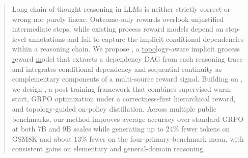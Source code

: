 \begin{abstract}
Long chain-of-thought reasoning in LLMs is neither strictly correct-or-wrong nor purely linear. Outcome-only rewards overlook unjustified intermediate steps, while existing process reward models depend on step-level annotations and fail to capture the implicit conditional dependencies within a reasoning chain.
We propose \method, a \underline{topo}logy-aware implicit \underline{p}rocess \underline{r}eward \underline{m}odel that extracts a dependency DAG from each reasoning trace and integrates conditional dependency and sequential continuity as complementary components of a multi-source reward signal. Building on \method, we design \framework, a post-training framework that combines supervised warm-start, GRPO optimization under a correctness-first hierarchical reward, and topology-guided on-policy distillation.
Across multiple public benchmarks, our method improves average accuracy over standard GRPO at both 7B and 9B scales while generating up to 24\% fewer tokens on GSM8K and about 13\% fewer on the four-primary-benchmark mean, with consistent gains on elementary and general-domain reasoning.
\end{abstract}